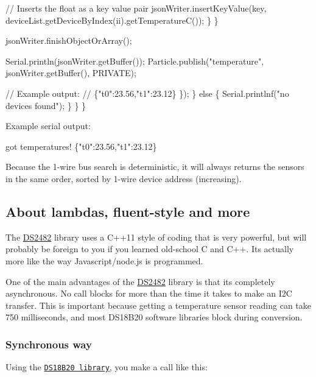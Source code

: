 \begin{DoxyCode}
                        // Inserts the float as a key value pair
                        jsonWriter.insertKeyValue(key, deviceList.getDeviceByIndex(ii).getTemperatureC());
                    \}
                \}

                jsonWriter.finishObjectOrArray();

                Serial.println(jsonWriter.getBuffer());
                Particle.publish("temperature", jsonWriter.getBuffer(), PRIVATE);

                // Example output:
                // \{"t0":23.56,"t1":23.12\}
            \});
        \}
        else \{
            Serial.printlnf("no devices found");
        \}
    \}
\}
\end{DoxyCode}


Example serial output\+:


\begin{DoxyCode}
got temperatures!
\{"t0":23.56,"t1":23.12\}
\end{DoxyCode}


Because the 1-\/wire bus search is deterministic, it will always returns the sensors in the same order, sorted by 1-\/wire device address (increasing).

\subsection*{About lambdas, fluent-\/style and more}

The \mbox{\hyperlink{class_d_s2482}{D\+S2482}} library uses a C++11 style of coding that is very powerful, but will probably be foreign to you if you learned old-\/school C and C++. It\textquotesingle{}s actually more like the way Javascript/node.\+js is programmed.

One of the main advantages of the \mbox{\hyperlink{class_d_s2482}{D\+S2482}} library is that it\textquotesingle{}s completely asynchronous. No call blocks for more than the time it takes to make an I2C transfer. This is important because getting a temperature sensor reading can take 750 milliseconds, and most D\+S18\+B20 software libraries block during conversion.

\subsubsection*{Synchronous way}

Using the \href{https://build.particle.io/libs/DS18B20/0.1.7/tab/DS18B20.cpp}{\tt D\+S18\+B20 library}, you make a call like this\+:


